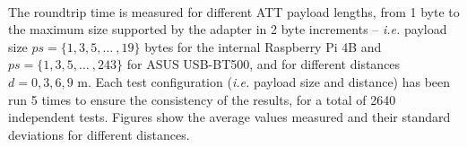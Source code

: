\paragraph{} The roundtrip time is measured for different \acs{ATT} payload lengths, from 1 byte to the maximum size supported by the adapter in 2 byte increments -- \textit{i.e.} payload size $ps=\{1,3,5,\dots\ , 19\}$ bytes for the internal Raspberry Pi 4B and  $ps=\{1,3,5,\dots\ , 243\}$ for ASUS USB-BT500, and for different distances $d={0,3,6,9}$ m. Each test configuration (\textit{i.e.} payload size and distance) has been run 5 times to ensure the consistency of the results, for a total of 2640 independent tests. 
Figures  show the average values measured and their standard deviations for different distances. 

